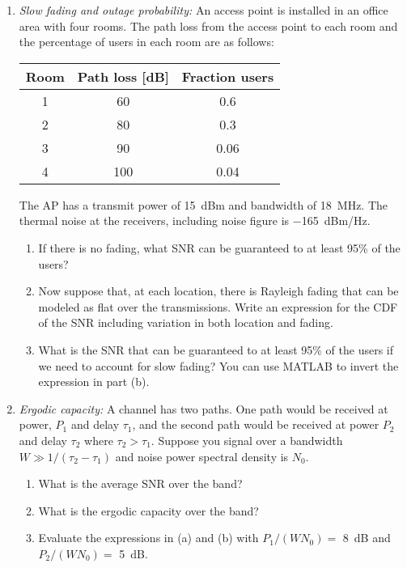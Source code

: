 \documentclass[11pt]{article}
\begin{document}
\begin{enumerate}
\item \emph{Slow fading and outage probability:}  An access point is installed in an office
area with four rooms.  The path loss from the access point to each room and the percentage of
users in each room are as follows:
\begin{center}
\begin{tabular}{|c|c|c|}
  \hline
  Room & Path loss [dB] & Fraction users \\ \hline
  1 & 60 & 0.6 \\ \hline
  2 & 80 & 0.3 \\ \hline
  3 & 90 & 0.06 \\ \hline
  4 & 100 & 0.04 \\ \hline
\end{tabular}
\end{center}
The AP has a transmit power of \SI{15}{dBm} and bandwidth of \SI{18}{MHz}.
The thermal noise at the receivers, including noise figure is \SI{-165}{dBm/Hz}.
\begin{enumerate}[label=(\alph*)]
\item If there is no fading, what SNR can be guaranteed to at least 95\% of the users?
\item Now suppose that, at each location, there is Rayleigh fading that can be modeled as flat
over the transmissions.
Write an expression for the CDF of the SNR including variation in both location and fading.
\item What is the SNR that can be guaranteed to at least 95\% of the users if we need
to account for slow fading?  You can use MATLAB to invert the expression in part (b).
\end{enumerate}

\item \emph{Ergodic capacity:}  A channel has two paths.  One path would be received
at power, $P_1$ and delay $\tau_1$, and the second path would be received at power
$P_2$ and delay $\tau_2$ where $\tau_2 > \tau_1$.  
Suppose you signal over a bandwidth $W \gg 1/(\tau_2 - \tau_1)$ and noise power spectral density
is $N_0$.
\begin{enumerate}[label=(\alph*)]
\item What is the average SNR over the band?
\item What is the ergodic capacity over the band?
\item Evaluate the expressions in (a) and (b) with  $P_1/(W N_0)=$ \SI{8}{dB}
and $P_2/(W N_0)=$ \SI{5}{dB}.
\end{enumerate}



\end{enumerate}
\end{document}
